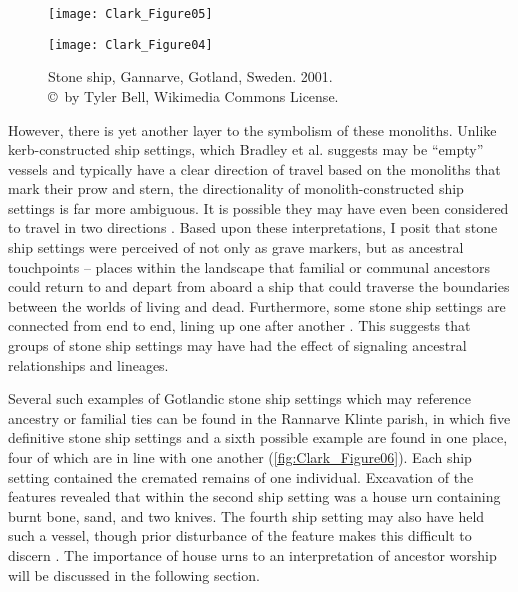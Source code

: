 \begin{figure}[!tb]
\begin{minipage}[t]{.49\linewidth}
	\texttt{[image: Clark\_Figure05]}
	\caption{Stone ship at Tofta högar (RAÄ Number Hov 109:1) in Hov parish, Bjäre hundred, Båstad municipality, Skåne County, Scania, Sweden. 2010.
		{\normalfont\scriptsize \\ \copyright\ ArchEllen, Wikimedia Commons License.
	}}
	\label{fig:Clark_Figure05}
\end{minipage}
\hfill
\begin{minipage}[t]{.49\linewidth}
	\texttt{[image: Clark\_Figure04]}
	\caption{Stone ship, Gannarve, Gotland, Sweden. 2001.
		{\normalfont\scriptsize \\ \copyright\ by Tyler Bell, Wikimedia Commons License.
	}}
	\label{fig:Clark_Figure04}
\end{minipage}
\end{figure}
However, there is yet another layer to the symbolism of these monoliths. Unlike kerb-constructed ship settings, which Bradley et al. suggests may be “empty” vessels and typically have a clear direction of travel based on the monoliths that mark their prow and stern, the directionality of monolith-constructed ship settings is far more ambiguous. It is possible they may have even been considered to travel in two directions \parencite[88]{Bradley_2010}.
Based upon these interpretations, I posit that stone ship settings were perceived of not only as grave markers, but as ancestral touchpoints – places within the landscape that familial or communal ancestors could return to and depart from aboard a ship that could traverse the boundaries between the worlds of living and dead. Furthermore, some stone ship settings are connected from end to end, lining up one after another \parencite[84]{Bradley_2010}. This suggests that groups of stone ship settings may have had the effect of signaling ancestral relationships and lineages.

Several such examples of Gotlandic stone ship settings which may reference ancestry or familial ties can be found in the Rannarve Klinte parish, in which five definitive stone ship settings and a sixth possible example are found in one place, four of which are in line with one another (\cref{fig:Clark_Figure06}).
Each ship setting contained the cremated remains of one individual. Excavation of the features revealed that within the second ship setting was a house urn containing burnt bone, sand, and two knives. The fourth ship setting may also have held such a vessel, though prior disturbance of the feature makes this difficult to discern \parencite[7-26]{Gustavsson_2012}. The importance of house urns to an interpretation of ancestor worship will be discussed in the following section.

